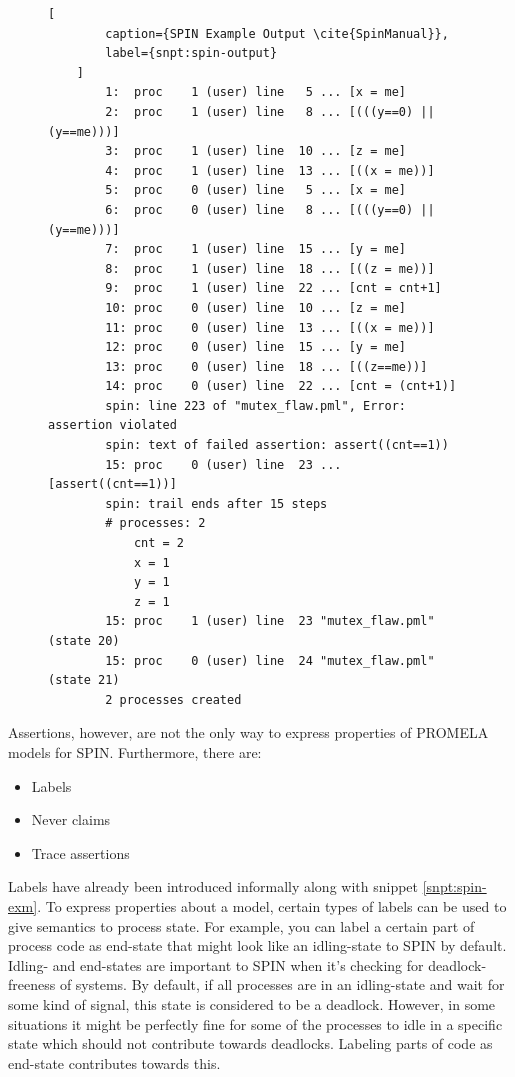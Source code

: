 \begin{figure}
    \begin{lstlisting}[
        caption={SPIN Example Output \cite{SpinManual}},
        label={snpt:spin-output}
    ]
        1:  proc    1 (user) line   5 ... [x = me]
        2:  proc    1 (user) line   8 ... [(((y==0) || (y==me)))]
        3:  proc    1 (user) line  10 ... [z = me]
        4:  proc    1 (user) line  13 ... [((x = me))]
        5:  proc    0 (user) line   5 ... [x = me]
        6:  proc    0 (user) line   8 ... [(((y==0) || (y==me)))]
        7:  proc    1 (user) line  15 ... [y = me]
        8:  proc    1 (user) line  18 ... [((z = me))]
        9:  proc    1 (user) line  22 ... [cnt = cnt+1]
        10: proc    0 (user) line  10 ... [z = me]
        11: proc    0 (user) line  13 ... [((x = me))]
        12: proc    0 (user) line  15 ... [y = me]
        13: proc    0 (user) line  18 ... [((z==me))]
        14: proc    0 (user) line  22 ... [cnt = (cnt+1)]
        spin: line 223 of "mutex_flaw.pml", Error: assertion violated
        spin: text of failed assertion: assert((cnt==1))
        15: proc    0 (user) line  23 ... [assert((cnt==1))]
        spin: trail ends after 15 steps
        # processes: 2
            cnt = 2
            x = 1
            y = 1
            z = 1
        15: proc    1 (user) line  23 "mutex_flaw.pml" (state 20)
        15: proc    0 (user) line  24 "mutex_flaw.pml" (state 21)
        2 processes created
    \end{lstlisting}
\end{figure}

Assertions, however, are not the only way to express properties of PROMELA models for SPIN.
Furthermore, there are:
\begin{itemize}
    \item Labels
    \item Never claims
    \item Trace assertions
\end{itemize}

Labels have already been introduced informally along with snippet \ref{snpt:spin-exm}.
To express properties about a model, certain types of labels can be used to give semantics to process state.
For example, you can label a certain part of process code as end-state that might look like an idling-state to SPIN by default.
Idling- and end-states are important to SPIN when it's checking for deadlock-freeness of systems.
By default, if all processes are in an idling-state and wait for some kind of signal, this state is considered to be a deadlock.
However, in some situations it might be perfectly fine for some of the processes to idle in a specific state which should not contribute towards deadlocks.
Labeling parts of code as end-state contributes towards this.

